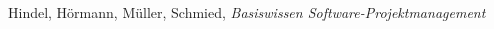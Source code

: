 \begin{thebibliography}{widest entry}

 Hindel, H\"ormann, M\"uller, Schmied, \emph{Basiswissen Software-Projektmanagement}

\end{thebibliography}